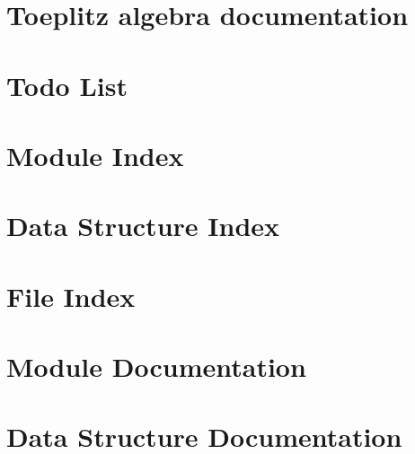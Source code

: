\documentclass{book}
\begin{document}
\chapter{Toeplitz algebra documentation}
\label{toeplitz}
\hypertarget{toeplitz}{}

\chapter{Todo List}
\label{todo}
\hypertarget{todo}{}

\chapter{Module Index}

\chapter{Data Structure Index}

\chapter{File Index}

\chapter{Module Documentation}

















\chapter{Data Structure Documentation}






\end{document}
